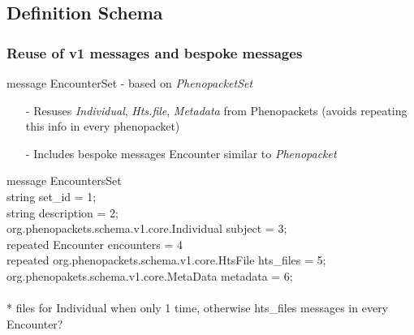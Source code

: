 \documentclass{beamer}
\begin{document}
\subsection{Definition Schema}


\begin{frame}
\frametitle{Reuse of v1 messages and bespoke messages}


\begin{block}{message EncounterSet - based on \textit{PhenopacketSet}}
\begin{itemize}
\item[-] Resuses \textit{Individual}, \textit{Hts.file}, \textit{Metadata} from Phenopackets (avoids repeating this info in every phenopacket)
\item[-] Includes bespoke messages Encounter similar to \textit{Phenopacket}  
\end{itemize}
\end{block}

message \colorbox{yellow!80}{EncountersSet} \ {  \\
    string set\_id = 1;\\
    string description = 2;\\
    org.phenopackets.schema.v1.core.Individual subject = 3;\\
    repeated \colorbox{yellow!80}{Encounter} encounters = 4 \\
    repeated org.phenopackets.schema.v1.core.HtsFile hts\_files = 5; \\
    org.phenopakets.schema.v1.core.MetaData metadata = 6; \\

\ } \\

{\color{blue}* files for Individual when only 1 time, otherwise hts\_files messages in every Encounter? } 

\end{frame}
\end{document}
